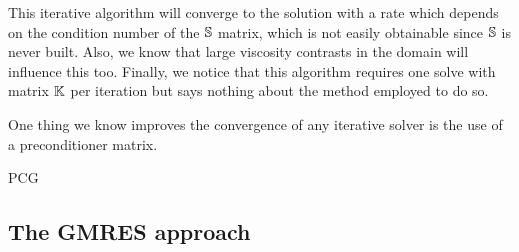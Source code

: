 This iterative algorithm will converge to the solution with a rate which depends on 
the condition number of the ${\mathbb{S}}$ matrix, which is not easily obtainable since 
${\mathbb{S}}$ is never built. Also, we know that large viscosity contrasts in the domain 
will influence this too. Finally, we notice that this algorithm requires one solve
with matrix ${\mathbb{K}}$ per iteration but says nothing about the method employed to do so.

One thing we know improves the convergence of any iterative solver is the use of a 
preconditioner matrix.  

{\color{red} PCG}










\subsection{The GMRES approach}
